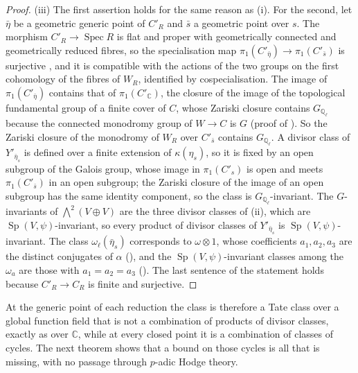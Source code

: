 \documentclass[11pt,reqno]{amsart}
\theoremstyle{plain}
\theoremstyle{definition}
\theoremstyle{remark}
\newcommand{\QQ}{\mathbb{Q}}
\newcommand{\CC}{\mathbb{C}}
\DeclareMathOperator{\Spec}{Spec}
\DeclareMathOperator{\Sp}{Sp}
\begin{document}
\begin{proof}
(iii) The first assertion holds for the same reason as (i). For the second,
let $\bar\eta$ be a geometric generic point of $C'_{R}$ and $\bar{s}$ a
geometric point over $s$. The morphism $C'_{R}\to\Spec R$ is flat and proper
with geometrically connected and geometrically reduced fibres, so the
specialisation map $\pi_{1}(C'_{\bar\eta})\to\pi_{1}(C'_{\bar{s}})$ is
surjective \cite[Tag~0C0P]{Stacks}, and it is compatible with the actions of
the two groups on the first cohomology of the fibres of $W_{R}$, identified by
cospecialisation. The image of $\pi_{1}(C'_{\bar\eta})$ contains that of
$\pi_{1}(C'_{\CC})$, the closure of the image of the topological fundamental
group of a finite cover of $C$, whose Zariski closure contains
$G_{\QQ_{\ell}}$ because the connected monodromy group of $W\to C$ is $G$
(proof of ). So the Zariski closure of the
monodromy of $W_{R}$ over $C'_{\bar{s}}$ contains $G_{\QQ_{\ell}}$. A divisor
class of $Y'_{\bar\eta_{s}}$ is defined over a finite extension of
$\kappa(\eta_{s})$, so it is fixed by an open subgroup of the Galois group,
whose image in $\pi_{1}(C'_{s})$ is open \cite[Tag~0BQI]{Stacks} and meets
$\pi_{1}(C'_{\bar{s}})$ in an open subgroup; the Zariski closure of the image
of an open subgroup has the same identity component, so the class is
$G_{\QQ_{\ell}}$-invariant. The $G$-invariants of ${\textstyle\bigwedge^{2}}(V\oplus V)$ are the
three divisor classes of (ii), which are
$\Sp(V,\psi)$-invariant, so every product of divisor classes of
$Y'_{\bar\eta_{s}}$ is $\Sp(V,\psi)$-invariant. The class
$\omega_{\ell}(\bar\eta_{s})$ corresponds to $\omega\otimes1$, whose
coefficients $a_{1},a_{2},a_{3}$ are the distinct conjugates of $\alpha$
(), and the $\Sp(V,\psi)$-invariant classes among the
$\omega_{a}$ are those with $a_{1}=a_{2}=a_{3}$ ().
The last sentence of the statement holds because $C'_{R}\to C_{R}$ is finite
and surjective.
\end{proof}

At the generic point of each reduction the class is therefore a Tate class
over a global function field that is not a combination of products of divisor
classes, exactly as over $\CC$, while at every closed point it is a
combination of classes of cycles. The next theorem shows that a bound on those
cycles is all that is missing, with no passage through $p$-adic Hodge theory.
\end{document}
